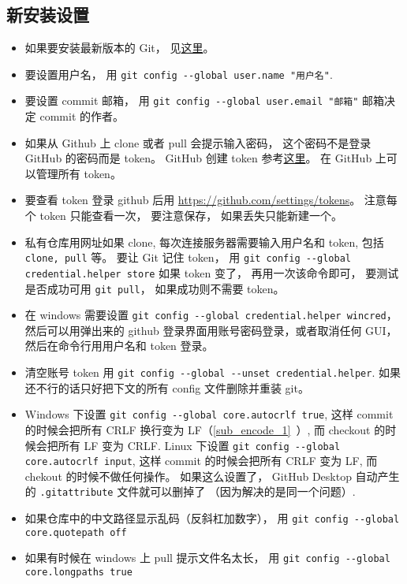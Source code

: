 \subsection{新安装设置}
\begin{itemize}
\item 如果要安装最新版本的 Git， 见\href{https://git-scm.com/downloads}{这里}。
\item 要设置用户名， 用 \verb|git config --global user.name "用户名"|.
\item 要设置 commit 邮箱， 用 \verb|git config --global user.email "邮箱"|  邮箱决定 commit 的作者。
\item 如果从 Github 上 clone 或者 pull 会提示输入密码， 这个密码不是登录 GitHub 的密码而是 token。 GitHub 创建 token 参考\href{https://docs.github.com/en/github/authenticating-to-github/keeping-your-account-and-data-secure/creating-a-personal-access-token#creating-a-token}{这里}。 在 GitHub 上可以管理所有 token。
\item 要查看 token 登录 github 后用 \href{https://github.com/settings/tokens/}{https://github.com/settings/tokens}。 注意每个 token 只能查看一次， 要注意保存， 如果丢失只能新建一个。
\item 私有仓库用网址如果 clone, 每次连接服务器需要输入用户名和 token, 包括 \verb|clone, pull| 等。 要让 Git 记住 token， 用 \verb|git config --global credential.helper store| 如果 token 变了， 再用一次该命令即可， 要测试是否成功可用 \verb|git pull|， 如果成功则不需要 token。
\item 在 windows 需要设置 \verb|git config --global credential.helper wincred|，然后可以用弹出来的 github 登录界面用账号密码登录，或者取消任何 GUI， 然后在命令行用用户名和 token 登录。
\item 清空账号 token 用 \verb|git config --global --unset credential.helper|. 如果还不行的话只好把下文的所有 config 文件删除并重装 git。
\item Windows 下设置 \verb|git config --global core.autocrlf true|, 这样 commit 的时候会把所有 CRLF 换行变为 LF（\autoref{sub_encode_1}~）, 而 checkout 的时候会把所有 LF 变为 CRLF. Linux 下设置 \verb|git config --global core.autocrlf input|, 这样 commit 的时候会把所有 CRLF 变为 LF, 而 chekout 的时候不做任何操作。 如果这么设置了， GitHub Desktop 自动产生的 \verb|.gitattribute| 文件就可以删掉了 （因为解决的是同一个问题）.
\item 如果仓库中的中文路径显示乱码（反斜杠加数字）， 用 \verb|git config --global core.quotepath off|
\item 如果有时候在 windows 上 pull 提示文件名太长， 用 \verb|git config --global core.longpaths true|

\end{itemize}

